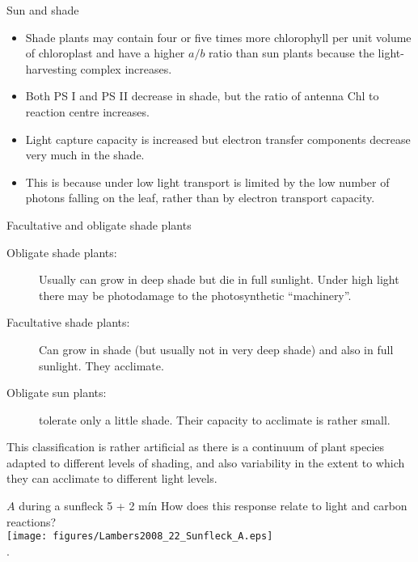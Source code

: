 \documentclass[10pt]{beamer}
\newcommand\webglyphs[1]{{\webglyphsfont\symbol{#1}}}
\newcommand\Discussion{\colorbox{white}{\textcolor{black}{\webglyphs{"F134}}}\xspace}
\begin{document}
\begin{frame}{Sun and shade}
    \begin{itemize}
        \item Shade plants may contain four or five times more chlorophyll per
        unit volume of chloroplast and have a higher $a/b$ ratio than
        sun plants because the light-harvesting complex increases.
        \item Both
        PS I and PS II decrease in shade, but the ratio of antenna Chl to
        reaction centre increases.
        \item Light capture capacity is increased but
        electron transfer components decrease very much in the shade.
        \item This is because under low light transport is limited by the
        low number of photons falling on the leaf, rather than by
        electron transport capacity.
    \end{itemize}
\end{frame}

\begin{frame}{Facultative and obligate shade plants}
    \begin{description}
        \item[Obligate shade plants:] Usually can grow in deep
        shade but die in full sunlight. Under high light there may
        be photodamage to the photosynthetic ``machinery''.
        \item[Facultative shade plants:] Can grow in shade (but
        usually not in very deep shade) and also in full sunlight.
        They acclimate.
        \item[Obligate sun plants:] tolerate only a little shade.
        Their capacity to acclimate is rather small.
    \end{description}
    \footnotesize This classification is rather artificial as there is a continuum
    of plant species adapted to different levels of shading, and
    also variability in the extent to which they can acclimate to
    different light levels.
\end{frame}

\begin{frame}{$A$ during a sunfleck \Discussion 5 + 2 mín}
    How does this response relate to light and carbon reactions?\\[1.5ex]
    \centering
    \texttt{[image: figures/Lambers2008\_22\_Sunfleck\_A.eps]}\\
    {\footnotesize \autocite[from][]{Lambers2008}.}
\end{frame}
\end{document}
